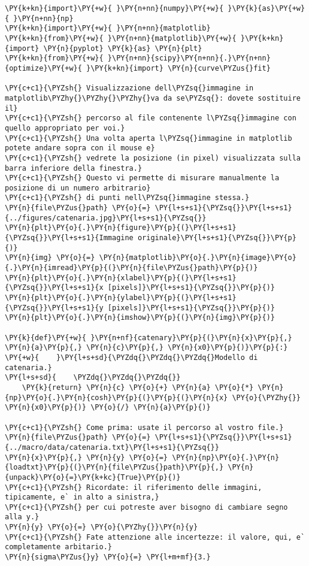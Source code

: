 \begin{Verbatim}[label=\makebox{\href{https://github.com/unipi-physics-labs/lab1-sheets/tree/main/snippy/dad_catenaria.py}{https://github.com/.../dad\_catenaria.py}},commandchars=\\\{\}]
\PY{k+kn}{import}\PY{+w}{ }\PY{n+nn}{numpy}\PY{+w}{ }\PY{k}{as}\PY{+w}{ }\PY{n+nn}{np}
\PY{k+kn}{import}\PY{+w}{ }\PY{n+nn}{matplotlib}
\PY{k+kn}{from}\PY{+w}{ }\PY{n+nn}{matplotlib}\PY{+w}{ }\PY{k+kn}{import} \PY{n}{pyplot} \PY{k}{as} \PY{n}{plt}
\PY{k+kn}{from}\PY{+w}{ }\PY{n+nn}{scipy}\PY{n+nn}{.}\PY{n+nn}{optimize}\PY{+w}{ }\PY{k+kn}{import} \PY{n}{curve\PYZus{}fit}

\PY{c+c1}{\PYZsh{} Visualizzazione dell\PYZsq{}immagine in matplotlib\PYZhy{}\PYZhy{}\PYZhy{}va da se\PYZsq{}: dovete sostituire il}
\PY{c+c1}{\PYZsh{} percorso al file contenente l\PYZsq{}immagine con quello appropriato per voi.}
\PY{c+c1}{\PYZsh{} Una volta aperta l\PYZsq{}immagine in matplotlib potete andare sopra con il mouse e}
\PY{c+c1}{\PYZsh{} vedrete la posizione (in pixel) visualizzata sulla barra inferiore della finestra.}
\PY{c+c1}{\PYZsh{} Questo vi permette di misurare manualmente la posizione di un numero arbitrario}
\PY{c+c1}{\PYZsh{} di punti nell\PYZsq{}immagine stessa.}
\PY{n}{file\PYZus{}path} \PY{o}{=} \PY{l+s+s1}{\PYZsq{}}\PY{l+s+s1}{../figures/catenaria.jpg}\PY{l+s+s1}{\PYZsq{}}
\PY{n}{plt}\PY{o}{.}\PY{n}{figure}\PY{p}{(}\PY{l+s+s1}{\PYZsq{}}\PY{l+s+s1}{Immagine originale}\PY{l+s+s1}{\PYZsq{}}\PY{p}{)}
\PY{n}{img} \PY{o}{=} \PY{n}{matplotlib}\PY{o}{.}\PY{n}{image}\PY{o}{.}\PY{n}{imread}\PY{p}{(}\PY{n}{file\PYZus{}path}\PY{p}{)}
\PY{n}{plt}\PY{o}{.}\PY{n}{xlabel}\PY{p}{(}\PY{l+s+s1}{\PYZsq{}}\PY{l+s+s1}{x [pixels]}\PY{l+s+s1}{\PYZsq{}}\PY{p}{)}
\PY{n}{plt}\PY{o}{.}\PY{n}{ylabel}\PY{p}{(}\PY{l+s+s1}{\PYZsq{}}\PY{l+s+s1}{y [pixels]}\PY{l+s+s1}{\PYZsq{}}\PY{p}{)}
\PY{n}{plt}\PY{o}{.}\PY{n}{imshow}\PY{p}{(}\PY{n}{img}\PY{p}{)}

\PY{k}{def}\PY{+w}{ }\PY{n+nf}{catenary}\PY{p}{(}\PY{n}{x}\PY{p}{,} \PY{n}{a}\PY{p}{,} \PY{n}{c}\PY{p}{,} \PY{n}{x0}\PY{p}{)}\PY{p}{:}
\PY{+w}{    }\PY{l+s+sd}{\PYZdq{}\PYZdq{}\PYZdq{}Modello di catenaria.}
\PY{l+s+sd}{    \PYZdq{}\PYZdq{}\PYZdq{}}
    \PY{k}{return} \PY{n}{c} \PY{o}{+} \PY{n}{a} \PY{o}{*} \PY{n}{np}\PY{o}{.}\PY{n}{cosh}\PY{p}{(}\PY{p}{(}\PY{n}{x} \PY{o}{\PYZhy{}} \PY{n}{x0}\PY{p}{)} \PY{o}{/} \PY{n}{a}\PY{p}{)}

\PY{c+c1}{\PYZsh{} Come prima: usate il percorso al vostro file.}
\PY{n}{file\PYZus{}path} \PY{o}{=} \PY{l+s+s1}{\PYZsq{}}\PY{l+s+s1}{../macro/data/catenaria.txt}\PY{l+s+s1}{\PYZsq{}}
\PY{n}{x}\PY{p}{,} \PY{n}{y} \PY{o}{=} \PY{n}{np}\PY{o}{.}\PY{n}{loadtxt}\PY{p}{(}\PY{n}{file\PYZus{}path}\PY{p}{,} \PY{n}{unpack}\PY{o}{=}\PY{k+kc}{True}\PY{p}{)}
\PY{c+c1}{\PYZsh{} Ricordate: il riferimento delle immagini, tipicamente, e` in alto a sinistra,}
\PY{c+c1}{\PYZsh{} per cui potreste aver bisogno di cambiare segno alla y.}
\PY{n}{y} \PY{o}{=} \PY{o}{\PYZhy{}}\PY{n}{y}
\PY{c+c1}{\PYZsh{} Fate attenzione alle incertezze: il valore, qui, e` completamente arbitario.}
\PY{n}{sigma\PYZus{}y} \PY{o}{=} \PY{l+m+mf}{3.}


\end{Verbatim}
